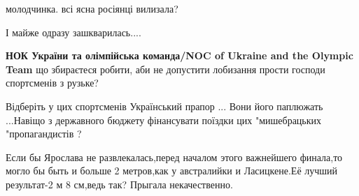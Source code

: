 \begin{itemize}
 
молодчинка. всі ясна росіянці вилизала?

 
І майже одразу зашкварилась....

 
\textbf{НОК України та олімпійська команда/NOC of Ukraine and the Olympic Team}
що збираєтеся робити, аби не допустити лобизання прости господи спортсменів з
рузьке?

 

Відберіть у цих спортсменів Український прапор ... Вони його паплюжать
...Навіщо з державного бюджету фінансувати поїздки цих "мишебрацьких
"пропагандистів ?


 

Если бы Ярослава не развлекалась,перед началом этого важнейшего финала,то могло
бы быть и больше 2 метров,как у австралийки и Ласицкене.Её лучший результат-2 м
8 см,ведь так? Прыгала некачественно.

\begin{itemize}
 

\end{itemize}
\end{itemize}
